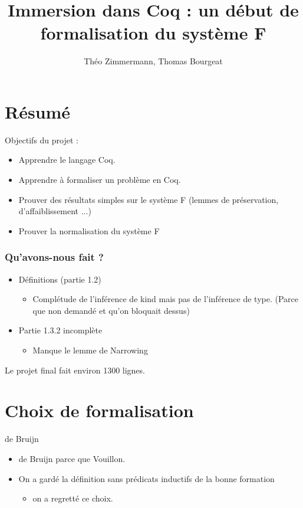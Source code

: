 \documentclass{beamer}
\begin{document}
	\title{Immersion dans Coq : un début de formalisation du système F}
	\author{Théo Zimmermann, Thomas Bourgeat}
\frame{\titlepage}
\frame{\tableofcontents}

\section{Résumé}

\begin{frame}
Objectifs du projet :
\begin{itemize}
\item Apprendre le langage Coq.
\pause
\item Apprendre à formaliser un problème en Coq.
\pause
\item {\scriptsize Prouver des résultats simples sur le système F (lemmes de
préservation, d'affaiblissement ...)}
\item {\tiny Prouver la normalisation du système F}
\end{itemize}


\end{frame}

    \begin{frame}
    \frametitle{Qu'avons-nous fait ?}
	\begin{itemize}
	\item Définitions (partie 1.2)
	\begin{itemize}
	\item Complétude de l'inférence de kind mais pas de l'inférence
	de type. (Parce que non demandé et qu'on bloquait dessus)
	\end{itemize}
	\pause
	\item Partie 1.3.2 incomplète
	\begin{itemize}
	\item Manque le lemme de Narrowing
	\end{itemize}
	\end{itemize}
	Le projet final fait environ 1300 lignes.
    \end{frame}
     
		
\section{Choix de formalisation}


\begin{frame}{de Bruijn}
\begin{itemize}
\item de Bruijn parce que Vouillon.
\pause
\item On a gardé la définition sans prédicats inductifs de la bonne
formation
\pause
\begin{itemize}
\item on a regretté ce choix.
\end{itemize}
\end{itemize}
\end{frame}
\end{document}
